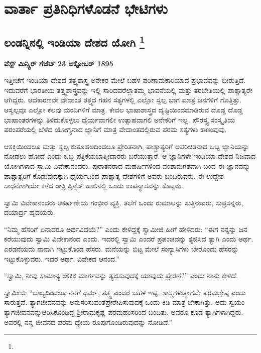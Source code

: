 

\part{ವಾರ್ತಾ ಪ್ರತಿನಿಧಿಗಳೊಡನೆ ಭೇಟಿಗಳು}

\chapter[ಲಂಡನ್ನಿನಲ್ಲಿ ಇಂಡಿಯಾ ದೇಶದ ಯೋಗಿ ]{ಲಂಡನ್ನಿನಲ್ಲಿ ಇಂಡಿಯಾ ದೇಶದ ಯೋಗಿ \protect\footnote{}}

\centerline{\textbf{ವೆಸ್ಟ್ ಮಿನ್ಸ್ಟಿರ್​ ಗೆಜೆಟ್​ 23 ಅಕ್ಟೋಬರ್​ 1895}}

ಇತ್ತೀಚೆಗೆ ಇಂಡಿಯಾ ದೇಶದ ತತ್ತ್ವಶಾಸ್ತ್ರ ಅನೇಕರ ಮೇಲೆ ಬಹಳ ಪರಿಣಾಮಕಾರಿಯಾದ ಪ್ರಭಾವವನ್ನು ಬೀರುತ್ತಿದೆ. ಇದುವರೆಗೆ ಭಾರತೀಯ ತತ್ತ್ವಶಾಸ್ತ್ರವನ್ನು ಇಲ್ಲಿ ಸಾರಿದವರೆಲ್ಲಾ\break ತಮ್ಮ ಭಾವನೆಯಲ್ಲಿ ಮತ್ತು ತರಬೇತಿಯಲ್ಲಿ ಪಾಶ್ಚಾತ್ಯರೇ ಆಗಿದ್ದರು. ಆದಕಾರಣವೇ ವೇದಾಂತ ತತ್ತ್ವದ ಗಹನ ಸತ್ಯಗಳಲ್ಲಿ ಎಲ್ಲೋ ಸ್ವಲ್ಪ ಭಾಗ ಮಾತ್ರ ಜನಗಳಿಗೆ ಗೊತ್ತಿತ್ತು. ಆ\break ಸ್ವಲ್ಪವೂ ಎಲ್ಲೋ ಕೆಲವು ಮಂದಿಗಳಿಗೆ ಮಾತ್ರ. ಕೇವಲ ಭಾಷಾಶಾಸ್ತ್ರದ ದೃಷ್ಟಿಯಿಂದ\break ಮಾಡಿರುವ ದೊಡ್ಡ ದೊಡ್ಡ ಭಾಷಾಂತರಗಳನ್ನು ತಿಳಿದುಕೊಳ್ಳಲು ಧೈರ್ಯವಾಗಲೀ ಉತ್ಸಾಹವಾಗಲಿ ಅನೇಕರಿಗೆ ಇಲ್ಲ. ಪೌರಸ್ತ್ಯ ಸಂಸ್ಕೃತಿಯ ಪರಂಪರೆಯಲ್ಲಿ ಬೆಳೆದ ಯೋಗ್ಯನಾದ ಜ್ಞಾನಿಗೆ ಮಾತ್ರ ವೇದಾಂತದಲ್ಲಿರುವ ಪರಮ ಸತ್ಯಗಳು ಕಾಣುವುವು.

ಆಸಕ್ತಿಯಿಂದಲೂ ಮತ್ತು ಸ್ವಲ್ಪ ಕುತೂಹಲದಿಂದಲೂ ಪ್ರೇರಿತನಾಗಿ, ಪಾಶ್ಚಾತ್ಯರಿಗೆ ಅಪರಿಚಿತನಾದ ಒಬ್ಬ ಜ್ಞಾನಿಯನ್ನು ನೋಡಲು ಹೋದೆ ಎಂದು ಒಬ್ಬ ಪತ್ರಿಕೆಯ\break ಬಾತ್ಮೀದಾರರು ಬರೆಯುತ್ತಾರೆ. ಆ ಜ್ಞಾನಿಗಳೇ ಇಂಡಿಯಾ ದೇಶದ ನಿಜವಾದ ಯೋಗಿಗಳಾದ ಸ್ವಾಮಿ ವಿವೇಕಾನಂದರು. ಪುರಾತನರಾದ ಮಹರ್ಷಿಗಳಿಂದ ವಂಶಾನುಗತವಾಗಿ ಬಂದ ಈ ಜ್ಞಾನವನ್ನು ಪಾಶ್ಚಾತ್ಯರಿಗೆ ಕೊಡುವುದಕ್ಕಾಗಿ ಧೈರ್ಯದಿಂದ ಪಾಶ್ಚಾತ್ಯ ದೇಶಗಳಿಗೆ ಅವರು ಬಂದಿರುವರು. ಈ ಉದ್ದೇಶ ಸಾಧನೆಗಾಗಿಯೇ ಕಳೆದ ರಾತ್ರಿ ಪ್ರಿನ್ಸೆಸ್​ ಹಾಲಿನಲ್ಲಿ ಒಂದು ಉಪನ್ಯಾಸವನ್ನು ಕೊಟ್ಟರು.

ಸ್ವಾಮಿ ವಿವೇಕಾನಂದರು ಆಕರ್ಷಣೀಯ ಗಂಭೀರ ವ್ಯಕ್ತಿ. ತಲೆಗೆ ಒಂದು ರುಮಾಲನ್ನು ಸುತ್ತಿರುವರು, ಸುಪ್ರಸನ್ನರು, ದಯಾರ್ದ್ರ ಹೃದಯರು.

“ನಿಮ್ಮ ಹೆಸರಿಗೆ ಏನಾದರೂ ಅರ್ಥವಿದೆಯೆ?” ಎಂದು ಕೇಳಿದ್ದಕ್ಕೆ ಸ್ವಾಮೀಜಿ ಹೀಗೆ ಹೇಳಿದರು: “ಈಗ ನನ್ನನ್ನು ಜನ ಕರೆಯುವುದು ಸ್ವಾಮಿ ವಿವೇಕಾನಂದ ಎಂದು. ಇದರಲ್ಲಿ ಸ್ವಾಮಿ ಎಂದರೆ ಪ್ರಪಂಚವನ್ನು ತ್ಯಜಿಸಿದ ತ್ಯಾಗಿ ಎಂದು ಅರ್ಥ. ಎರಡನೆಯದು ನಾನಾಗಿ ಇಟ್ಟುಕೊಂಡ ಹೆಸರು. ಮನೆಯನ್ನು ಬಿಟ್ಟ ಮೇಲೆ ಸಂನ್ಯಾಸಿಗಳು ಬೇರೊಂದು ಹೆಸರನ್ನು ಇಟ್ಟುಕೊಳ್ಳುವರು. ಇದರ ಅರ್ಥ; ವಿವೇಕದ ಆನಂದ.”

“ಸ್ವಾಮಿ, ನೀವು ಸಾಮಾನ್ಯ ಲೌಕಿಕ ಮಾರ್ಗವನ್ನು ತ್ಯಜಿಸುವುದಕ್ಕೆ ಯಾವುದು ಪ್ರೇರಣೆ?” ಎಂದು ನಾನು ಕೇಳಿದೆ.

ಸ್ವಾಮೀಜಿ: “ಬಾಲ್ಯದಿಂದಲೂ ನನಗೆ ಧರ್ಮ, ತತ್ತ್ವ ಎಂದರೆ ಬಹಳ ಇಷ್ಟ. ಶಾಸ್ತ್ರಗಳು\break ತ್ಯಾಗವೇ ಪರಮಶ್ರೇಷ್ಠ ಎಂದು ಸಾರುತ್ತವೆ. ತ್ಯಾಗಜೀವನವನ್ನು ಅನುಸರಿಸುವಂತೆ\break ಪ್ರೇರೇಪಿಸುವುದಕ್ಕೆ ಒಂದು ಕಿಡಿ ಮಾತ್ರ ಬೇಕಾಗಿತ್ತು. ಅದು ಸ್ವಯಂ ತ್ಯಾಗಜೀವನವನ್ನು\break ಆರಿಸಿಕೊಂಡಿದ್ದ ಶ‍್ರೀರಾಮಕೃಷ್ಣ ಪರಮಹಂಸರಿಂದ ಬಂದಿತು. ಅವರೂ ಕೂಡ ತ್ಯಾಗಿಗಳಾಗಿದ್ದರು. ಅವರಲ್ಲಿ ನನ್ನ ಜೀವನದ ಪರಮ ಧ್ಯೇಯ ರೂಪುಗೊಂಡಿರುವುದನ್ನು ನೋಡಿದೆ.”

